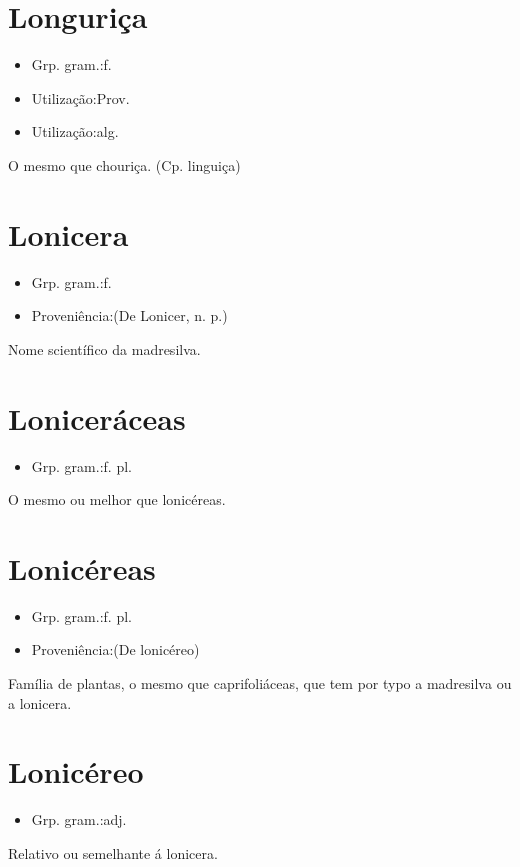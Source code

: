 \section{Longuriça}
\begin{itemize}
\item {Grp. gram.:f.}
\end{itemize}
\begin{itemize}
\item {Utilização:Prov.}
\end{itemize}
\begin{itemize}
\item {Utilização:alg.}
\end{itemize}
O mesmo que \textunderscore chouriça\textunderscore .
(Cp. \textunderscore linguiça\textunderscore )
\section{Lonicera}
\begin{itemize}
\item {Grp. gram.:f.}
\end{itemize}
\begin{itemize}
\item {Proveniência:(De \textunderscore Lonicer\textunderscore , n. p.)}
\end{itemize}
Nome scientífico da madresilva.
\section{Loniceráceas}
\begin{itemize}
\item {Grp. gram.:f. pl.}
\end{itemize}
O mesmo ou melhor que \textunderscore lonicéreas\textunderscore .
\section{Lonicéreas}
\begin{itemize}
\item {Grp. gram.:f. pl.}
\end{itemize}
\begin{itemize}
\item {Proveniência:(De \textunderscore lonicéreo\textunderscore )}
\end{itemize}
Família de plantas, o mesmo que \textunderscore caprifoliáceas\textunderscore , que tem por typo a madresilva ou a lonicera.
\section{Lonicéreo}
\begin{itemize}
\item {Grp. gram.:adj.}
\end{itemize}
Relativo ou semelhante á lonicera.
